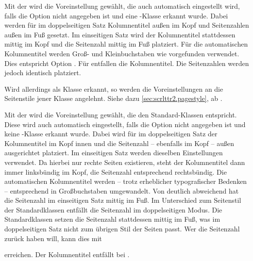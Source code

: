 Mit der 
 wird
die Voreinstellung gewählt, die auch automatisch eingestellt wird, falls die
Option nicht angegeben ist und eine \KOMAScript-Klasse erkannt wurde. Dabei
werden für  im doppelseitigen Satz
Kolumnentitel außen im Kopf und Seitenzahlen außen im Fuß gesetzt. Im
einseitigen Satz wird der Kolumnentitel stattdessen mittig im Kopf und die
Seitenzahl mittig im Fuß platziert. Für die automatischen Kolumnentitel werden
Groß- und Kleinbuchstaben wie vorgefunden verwendet. Dies entspricht Option
%
. Für
 entfallen die
Kolumnentitel. Die Seitenzahlen werden jedoch identisch platziert.

Wird allerdings \hyperref[cha:scrlttr2]{}%
%
 als Klasse erkannt, so werden die Voreinstellungen an
die Seitenstile jener Klasse angelehnt. Siehe dazu
\autoref{sec:scrlttr2.pagestyle}, ab .

Mit der 
 wird die
Voreinstellung gewählt, die den Standard-Klassen entspricht. Diese wird auch
automatisch eingestellt, falls die Option nicht angegeben ist und keine
\KOMAScript-Klasse erkannt wurde. Dabei wird für
 im doppelseitigen Satz der
Kolumnentitel im Kopf innen und die Seitenzahl -- ebenfalls im Kopf -- außen
ausgerichtet platziert. Im einseitigen Satz werden dieselben Einstellungen
verwendet. Da hierbei nur rechte Seiten existieren, steht der Kolumnentitel
dann immer linksbündig im Kopf, die Seitenzahl entsprechend rechtsbündig. Die
automatischen Kolumnentitel werden -- trotz erheblicher typografischer
Bedenken -- entsprechend
%
 in Großbuchstaben
umgewandelt. Von  deutlich
abweichend hat  die Seitenzahl
im einseitigen Satz mittig im Fuß. Im Unterschied zum Seitenstil  der Standardklassen
entfällt die Seitenzahl im doppelseitigen Modus. Die Standardklassen setzen
die Seitenzahl stattdessen mittig im Fuß, was im doppelseitigen Satz nicht zum
übrigen Stil der Seiten passt.%
\iftrue %
Wer die Seitenzahl zurück haben will, kann dies mit
\begin{lstcode}[belowskip=-1\baselineskip plus \dp\strutbox]
  \cfoot[\pagemark]{}
\end{lstcode}
erreichen. %
\fi%
Der Kolumnentitel entfällt bei
.

